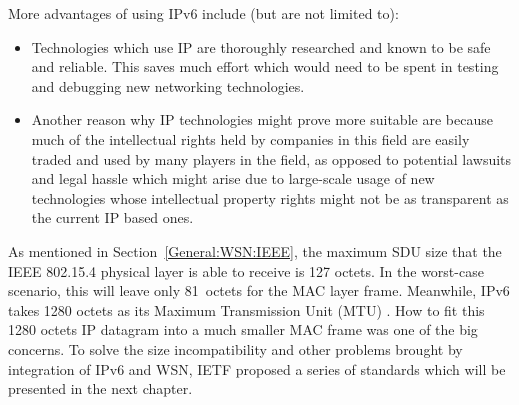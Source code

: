 More advantages of using IPv6 include (but are not limited to):  
\begin{itemize}
 
\item Technologies which use IP are thoroughly researched and known to be safe and reliable.  This saves much effort which would need to be spent in testing and debugging new networking technologies. 

\item Another reason why IP technologies might prove more suitable are because much of the intellectual rights held by companies in this field are easily traded and used by many players in the field, as opposed to potential lawsuits and legal hassle which might arise due to large-scale usage of new technologies whose intellectual property rights might not be as transparent as the current IP based ones.

\end{itemize}

As mentioned in Section~\ref{General:WSN:IEEE}, the maximum SDU size that the IEEE 802.15.4 physical layer is able to receive is 127 octets. In the worst-case scenario, this will leave only 81~octets for the MAC layer frame. Meanwhile, IPv6 takes 1280 octets as its Maximum Transmission Unit (MTU) \cite{RFC 4919}. How to fit this 1280 octets IP datagram into a much smaller MAC frame was one of the big concerns. To solve the  size incompatibility and other problems brought by integration of IPv6 and WSN, IETF proposed a series of standards which will be presented in the next chapter.
